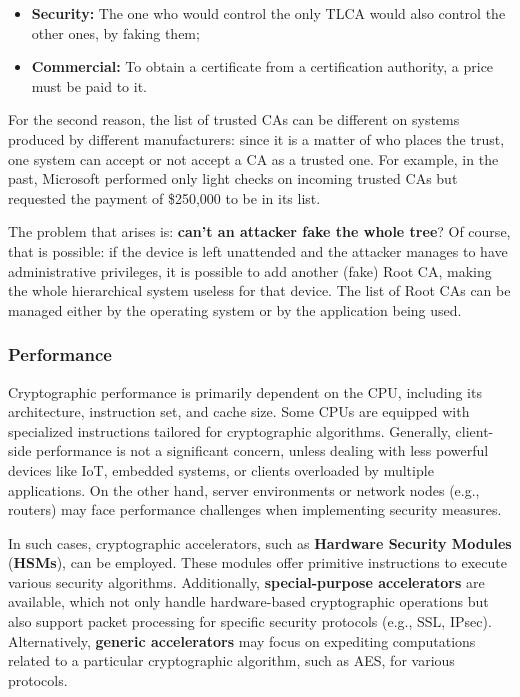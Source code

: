 \begin{itemize}
	\item \textbf{Security:} The one who would control the only TLCA would also control the other ones, by faking them;
	\item \textbf{Commercial:} To obtain a certificate from a certification authority, a price must be paid to it.
\end{itemize}

For the second reason, the list of trusted CAs can be different on systems produced by different manufacturers: since it is a matter of who places the trust, one system can accept or not accept a CA as a trusted one. For example, in the past, Microsoft performed only light checks on incoming trusted CAs but requested the payment of \$250,000 to be in its list.

The problem that arises is: \textbf{can't an attacker fake the whole tree}?
Of course, that is possible: if the device is left unattended and the attacker manages to have administrative privileges, it is possible to add another (fake) Root CA, making the whole hierarchical system useless for that device.
The list of Root CAs can be managed either by the operating system or by the application being used.


\subsubsection{Performance}
Cryptographic performance is primarily dependent on the CPU, including its architecture, instruction set, and cache size. Some CPUs are equipped with specialized instructions tailored for cryptographic algorithms. Generally, client-side performance is not a significant concern, unless dealing with less powerful devices like IoT, embedded systems, or clients overloaded by multiple applications. On the other hand, server environments or network nodes (e.g., routers) may face performance challenges when implementing security measures.

In such cases, cryptographic accelerators, such as \textbf{Hardware Security Modules} (\textbf{HSMs}), can be employed. These modules offer primitive instructions to execute various security algorithms. Additionally, \textbf{special-purpose accelerators} are available, which not only handle hardware-based cryptographic operations but also support packet processing for specific security protocols (e.g., SSL, IPsec). Alternatively, \textbf{generic accelerators} may focus on expediting computations related to a particular cryptographic algorithm, such as AES, for various protocols.


